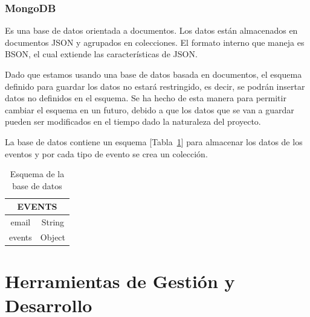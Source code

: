 \subsubsection{MongoDB~\cite{mongo}}

Es una base de datos orientada a documentos. Los datos están almacenados en documentos JSON y agrupados en colecciones. El formato interno que maneja es BSON, el cual extiende las características de JSON.


Dado que estamos usando una base de datos basada en documentos, el esquema definido para guardar los datos no estará restringido, es decir, se podrán insertar datos no definidos en el esquema. Se ha hecho de esta manera para permitir cambiar el esquema en un futuro, debido a que los datos que se van a guardar pueden ser modificados en el tiempo dado la naturaleza del proyecto.

La base de datos contiene un esquema [Tabla~\ref{tab:mongo_db}] para almacenar los datos de los eventos y por cada tipo de evento se crea un colección.


\begin{table}[h]
    \centering
\begin{tabular}{ c  c}
    \toprule
    \multicolumn{2}{c}{\textbf{EVENTS}} \\
    \midrule
         email      &  String \\
         events     & Object \\
     \bottomrule
\end{tabular}
\caption{Esquema de la base de datos}
    \label{tab:mongo_db}
\end{table}

\section{Herramientas de Gestión y Desarrollo}

